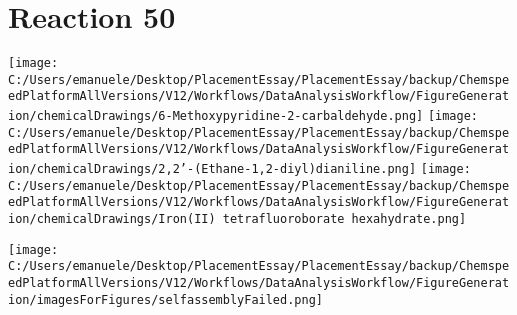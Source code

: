 \documentclass{article}%
\begin{document}
\section*{Reaction 50}%
%
\begin{scheme}[H]%
\begin{minipage}{0.5\textwidth}%
\texttt{[image: C:/Users/emanuele/Desktop/PlacementEssay/PlacementEssay/backup/ChemspeedPlatformAllVersions/V12/Workflows/DataAnalysisWorkflow/FigureGeneration/chemicalDrawings/6-Methoxypyridine-2-carbaldehyde.png]}%
\texttt{[image: C:/Users/emanuele/Desktop/PlacementEssay/PlacementEssay/backup/ChemspeedPlatformAllVersions/V12/Workflows/DataAnalysisWorkflow/FigureGeneration/chemicalDrawings/2,2'-(Ethane-1,2-diyl)dianiline.png]}%
\texttt{[image: C:/Users/emanuele/Desktop/PlacementEssay/PlacementEssay/backup/ChemspeedPlatformAllVersions/V12/Workflows/DataAnalysisWorkflow/FigureGeneration/chemicalDrawings/Iron(II) tetrafluoroborate hexahydrate.png]}%
\end{minipage}%
\begin{minipage}{0.5\textwidth}%
\begin{center}%
\texttt{[image: C:/Users/emanuele/Desktop/PlacementEssay/PlacementEssay/backup/ChemspeedPlatformAllVersions/V12/Workflows/DataAnalysisWorkflow/FigureGeneration/imagesForFigures/selfassemblyFailed.png]}%
\end{center}%
\end{minipage}%
\caption{Self-assembly of components 6, 20, with Iron(II) in a 3.0:1.5:1.0 molar ratio in CH$_3$CN at 60\textdegree C for 40h. These are the reagents (starting materials) for reaction 50.}%
\end{scheme}%
\end{document}
